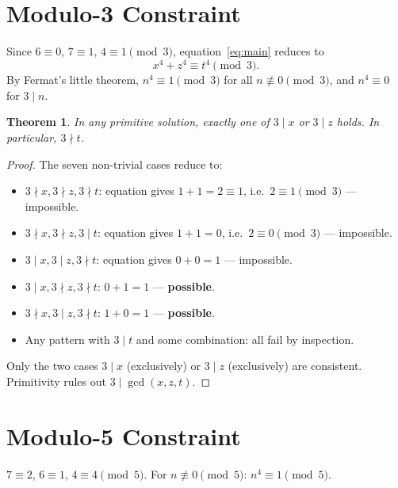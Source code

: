 \documentclass[12pt, a4paper]{article}
\newtheorem{theorem}{Theorem}[section]
\theoremstyle{definition}
\begin{document}
\section{Modulo-3 Constraint}

Since $6 \equiv 0$, $7 \equiv 1$, $4 \equiv 1 \pmod{3}$, equation~\eqref{eq:main}
reduces to
\[
  x^4 + z^4 \equiv t^4 \pmod{3}.
\]
By Fermat's little theorem, $n^4 \equiv 1 \pmod{3}$ for all $n \not\equiv 0 \pmod{3}$,
and $n^4 \equiv 0$ for $3 \mid n$.

\begin{theorem}\label{thm:mod3}
  In any primitive solution, exactly one of $3 \mid x$ or $3 \mid z$ holds.
  In particular, $3 \nmid t$.
\end{theorem}

\begin{proof}
The seven non-trivial cases reduce to:
\begin{itemize}
  \item $3 \nmid x, 3 \nmid z, 3 \nmid t$: equation gives $1+1=2 \equiv 1$,
        i.e.\ $2 \equiv 1 \pmod{3}$ — impossible.
  \item $3 \nmid x, 3 \nmid z, 3 \mid t$: equation gives $1+1=0$,
        i.e.\ $2 \equiv 0 \pmod{3}$ — impossible.
  \item $3 \mid x, 3 \mid z, 3 \nmid t$: equation gives $0+0=1$
        — impossible.
  \item $3 \mid x, 3 \nmid z, 3 \nmid t$: $0+1=1$ — \textbf{possible}.
  \item $3 \nmid x, 3 \mid z, 3 \nmid t$: $1+0=1$ — \textbf{possible}.
  \item Any pattern with $3 \mid t$ and some combination: all fail by inspection.
\end{itemize}
Only the two cases $3 \mid x$ (exclusively) or $3 \mid z$ (exclusively) are consistent.
Primitivity rules out $3 \mid \gcd(x,z,t)$.
\end{proof}

\section{Modulo-5 Constraint}

$7 \equiv 2$, $6 \equiv 1$, $4 \equiv 4 \pmod{5}$. For $n \not\equiv 0 \pmod{5}$:
$n^4 \equiv 1 \pmod{5}$.
\end{document}
